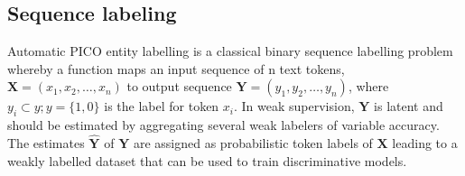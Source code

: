 \documentclass[10.7pt,]{article}
\begin{document}
\subsection{Sequence labeling}\label{seq_lab}
%
Automatic PICO entity labelling is a classical binary sequence labelling problem whereby a function maps an input sequence of n text tokens, $ \bm{X} = (x_{1}, x_{2}, \dotso , x_{n} )$ to output sequence $\bm{Y} = (y_{1}, y_{2}, \dotso , y_{n} )$, where $y_{i} \subset y; y = \{1,0\} $ is the label for token $x_{i}$.
In weak supervision, $\bm{Y}$ is latent and should be estimated by aggregating several weak labelers of variable accuracy.
The estimates $\bm{\hat{Y}}$ of $\bm{Y}$ are assigned as probabilistic token labels of $\bm{X}$ leading to a weakly labelled dataset that can be used to train discriminative models.
%
\end{document}
